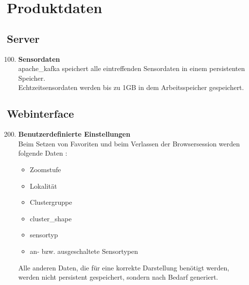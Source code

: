 \chapter{Produktdaten}
\section{Server}
\begin{enumerate}[label=\textbf{PD\arabic{enumi}0}]
	\setcounter{enumi}{99}
	\item \textbf{Sensordaten}\\
	\gls{apache_kafka} speichert alle eintreffenden Sensordaten in einem persistenten Speicher.\\
	Echtzeitsensordaten werden bis zu 1GB in dem Arbeitsspeicher gespeichert.
\end{enumerate}
\section{Webinterface}
\begin{enumerate}[label=\textbf{PD\arabic{enumi}0}]
	\setcounter{enumi}{199}
	\item \textbf{Benutzerdefinierte Einstellungen}\\
	Beim Setzen von Favoriten und beim Verlassen der Browsersession werden folgende Daten :
	\begin{itemize}
		\item Zoomstufe
		\item Lokalität
		\item Clustergruppe
		\item \gls{cluster_shape}
		\item \gls{sensortyp}
		\item an- bzw. ausgeschaltete Sensortypen
	\end{itemize}
	Alle anderen Daten, die für eine korrekte Darstellung benötigt werden, werden nicht persistent gespeichert, sondern nach Bedarf generiert.
\end{enumerate}
